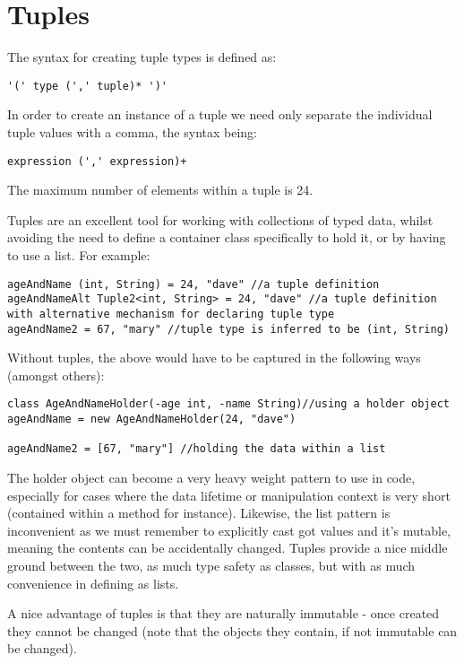 \documentclass[conc-doc]{subfiles}
\begin{document}
	
	\chapter[Tuples]{Tuples}
	\label{chap:tuples}
The syntax for creating tuple types is defined as:
\begin{center}
	\lstinline{'(' type (',' tuple)* ')'}
\end{center}

In order to create an instance of a tuple we need only separate the individual tuple values with a comma, the syntax being:
\begin{center}
	\lstinline{expression (',' expression)+}
\end{center}

The maximum number of elements within a tuple is 24.

Tuples are an excellent tool for working with collections of typed data, whilst avoiding the need to define a container class specifically to hold it, or by having to use a list. For example:
\begin{lstlisting}
ageAndName (int, String) = 24, "dave" //a tuple definition
ageAndNameAlt Tuple2<int, String> = 24, "dave" //a tuple definition with alternative mechanism for declaring tuple type
ageAndName2 = 67, "mary" //tuple type is inferred to be (int, String)
\end{lstlisting}

Without tuples, the above would have to be captured in the following ways (amongst others):
\begin{lstlisting}
class AgeAndNameHolder(-age int, -name String)//using a holder object
ageAndName = new AgeAndNameHolder(24, "dave")

ageAndName2 = [67, "mary"] //holding the data within a list
\end{lstlisting}

The holder object can become a very heavy weight pattern to use in code, especially for cases where the data lifetime or manipulation context is very short (contained within a method for instance). Likewise, the list pattern is inconvenient as we must remember to explicitly cast got values and it's mutable, meaning the contents can be accidentally changed. Tuples provide a nice middle ground between the two, as much type safety as classes, but with as much convenience in defining as lists.

A nice advantage of tuples is that they are naturally immutable - once created they cannot be changed (note that the objects they contain, if not immutable can be changed).
\end{document}
